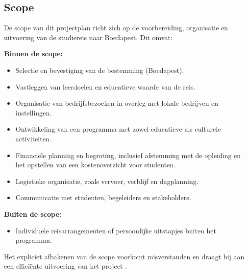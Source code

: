 \subsection{Scope}

De scope van dit projectplan richt zich op de voorbereiding, organisatie en uitvoering van de studiereis naar Boedapest. Dit omvat:

\textbf{Binnen de scope:}

\begin{itemize}
	\item Selectie en bevestiging van de bestemming (Boedapest).
	\item Vastleggen van leerdoelen en educatieve waarde van de reis.
	\item Organisatie van bedrijfsbezoeken in overleg met lokale bedrijven en instellingen.
	\item Ontwikkeling van een programma met zowel educatieve als culturele activiteiten.
	\item Financiële planning en begroting, inclusief afstemming met de opleiding en het opstellen van een kostenoverzicht voor studenten.
	\item Logistieke organisatie, zoals vervoer, verblijf en dagplanning.
	\item Communicatie met studenten, begeleiders en stakeholders.
\end{itemize}

\textbf{Buiten de scope:}

\begin{itemize}
	\item Individuele reisarrangementen of persoonlijke uitstapjes buiten het programma.
\end{itemize}

\noindent Het expliciet afbakenen van de scope voorkomt misverstanden en draagt bij aan een efficiënte uitvoering van het project \cite{pmibook2021}.